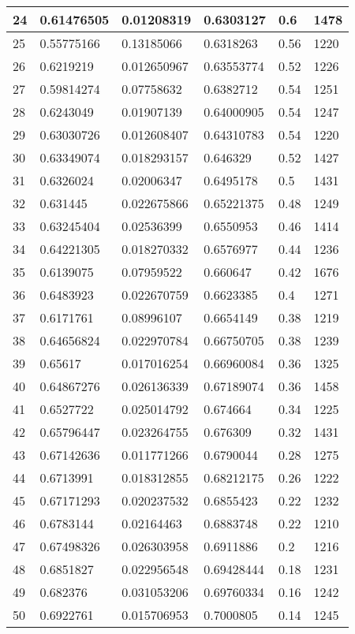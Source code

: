 \begin{longtable}{|l|l|l|l|l|l|}
24 & 0.61476505 & 0.01208319 & 0.6303127 & 0.6 & 1478 \\ \hline 
25 & 0.55775166 & 0.13185066 & 0.6318263 & 0.56 & 1220 \\ \hline 
26 & 0.6219219 & 0.012650967 & 0.63553774 & 0.52 & 1226 \\ \hline 
27 & 0.59814274 & 0.07758632 & 0.6382712 & 0.54 & 1251 \\ \hline 
28 & 0.6243049 & 0.01907139 & 0.64000905 & 0.54 & 1247 \\ \hline 
29 & 0.63030726 & 0.012608407 & 0.64310783 & 0.54 & 1220 \\ \hline 
30 & 0.63349074 & 0.018293157 & 0.646329 & 0.52 & 1427 \\ \hline 
31 & 0.6326024 & 0.02006347 & 0.6495178 & 0.5 & 1431 \\ \hline 
32 & 0.631445 & 0.022675866 & 0.65221375 & 0.48 & 1249 \\ \hline 
33 & 0.63245404 & 0.02536399 & 0.6550953 & 0.46 & 1414 \\ \hline 
34 & 0.64221305 & 0.018270332 & 0.6576977 & 0.44 & 1236 \\ \hline 
35 & 0.6139075 & 0.07959522 & 0.660647 & 0.42 & 1676 \\ \hline 
36 & 0.6483923 & 0.022670759 & 0.6623385 & 0.4 & 1271 \\ \hline 
37 & 0.6171761 & 0.08996107 & 0.6654149 & 0.38 & 1219 \\ \hline 
38 & 0.64656824 & 0.022970784 & 0.66750705 & 0.38 & 1239 \\ \hline 
39 & 0.65617 & 0.017016254 & 0.66960084 & 0.36 & 1325 \\ \hline 
40 & 0.64867276 & 0.026136339 & 0.67189074 & 0.36 & 1458 \\ \hline 
41 & 0.6527722 & 0.025014792 & 0.674664 & 0.34 & 1225 \\ \hline 
42 & 0.65796447 & 0.023264755 & 0.676309 & 0.32 & 1431 \\ \hline 
43 & 0.67142636 & 0.011771266 & 0.6790044 & 0.28 & 1275 \\ \hline 
44 & 0.6713991 & 0.018312855 & 0.68212175 & 0.26 & 1222 \\ \hline 
45 & 0.67171293 & 0.020237532 & 0.6855423 & 0.22 & 1232 \\ \hline 
46 & 0.6783144 & 0.02164463 & 0.6883748 & 0.22 & 1210 \\ \hline 
47 & 0.67498326 & 0.026303958 & 0.6911886 & 0.2 & 1216 \\ \hline 
48 & 0.6851827 & 0.022956548 & 0.69428444 & 0.18 & 1231 \\ \hline 
49 & 0.682376 & 0.031053206 & 0.69760334 & 0.16 & 1242 \\ \hline 
50 & 0.6922761 & 0.015706953 & 0.7000805 & 0.14 & 1245 \\ \hline 
\end{longtable}